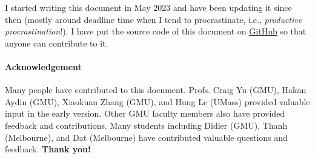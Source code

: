 \documentclass[11pt]{article}
\newcommand{\mycomment}[3][\color{blue}]{{#1{{#2}: {#3}}}}
\newcommand{\didi}[1]{\mycomment{Didier}{#1}}{}
\begin{document}
I started writing this document in May 2023 and have been updating it since then (mostly around deadline time when I tend to procrastinate, i.e., \emph{productive procrastination}!). I have put the source code of this document on \href{https://github.com/nguyenthanhvuh/phd-cs-us}{GitHub} so that anyone can contribute to it.  

\paragraph{Acknowledgement} Many people have contributed to this document.
Profs. Craig Yu (GMU), Hakan Aydin (GMU), 
Xiaokuan Zhang (GMU), and Hung Le (UMass) provided valuable input in the early version. Other GMU faculty members also have provided feedback and contributions.  Many students including Didier (GMU), Thanh (Melbourne), and Dat (Melbourne) have contributed valuable questions and feedback. 
\textbf{Thank you!}






\end{document}
